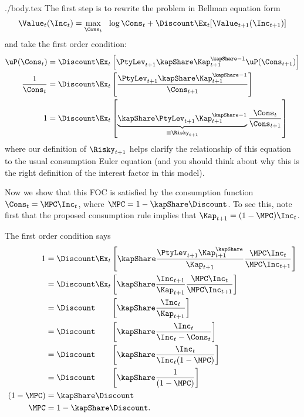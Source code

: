 \documentclass{handout}
\begin{document}
\begin{verbatimwrite}{./body.tex}
The first step is to rewrite the problem in Bellman equation form
\begin{equation}
        \Value_{t}(\Inc_{t}) = \max_{\Cons_{t}} ~~ \log \Cons_{t} + \Discount \Ex_{t} [\Value_{t+1}(\Inc_{t+1})]
\end{equation}
and take the first order condition:
\begin{equation*}\begin{gathered}\begin{aligned}
        \uP(\Cons_{t}) & =  \Discount \Ex_{t}\left[\PtyLev_{t+1} \kapShare \Kap_{t+1}^{\kapShare-1} \uP(\Cons_{t+1})\right]  \\
        \frac{1}{\Cons_{t}} & =  \Discount \Ex_{t}\left[\frac{\PtyLev_{t+1} \kapShare \Kap_{t+1}^{\kapShare-1}}{\Cons_{t+1}}\right]  \\
        1 & =  \Discount \Ex_{t} \left[\underbrace{\kapShare \PtyLev_{t+1} \Kap_{t+1}^{\kapShare-1}}_{\equiv \Risky_{t+1}}\frac{\Cons_{t}}{\Cons_{t+1}}\right] 
\end{aligned}\end{gathered}\end{equation*}
where our definition of $\Risky_{t+1}$ helps clarify the relationship of this equation
to the usual consumption Euler equation (and you should think about why this is the
right definition of the interest factor in this model).  

Now we show that this FOC is satisfied by the consumption function $\Cons_{t} =
\MPC \Inc_{t}$, where $\MPC = 1-\kapShare \Discount$.  To see this, note
first that the proposed consumption rule implies that $\Kap_{t+1} =
(1-\MPC) \Inc_{t}$.

The first order condition says
\begin{equation*}\begin{gathered}\begin{aligned}
1  & =  \Discount \Ex_{t} \left[\kapShare \frac{\PtyLev_{t+1} \Kap_{t+1}^{\kapShare}}{\Kap_{t+1}}\frac{\MPC \Inc_{t}}{\MPC \Inc_{t+1}}\right]  
\\  & =  \Discount \Ex_{t} \left[\kapShare \frac{\Inc_{t+1}}{\Kap_{t+1}}\frac{\MPC \Inc_{t}}{\MPC \Inc_{t+1}}\right]  
\\ & =  \Discount \phantom{\Ex_{t}} \left[\kapShare \frac{\Inc_{t}}{\Kap_{t+1}}\right]
\\ & =  \Discount \phantom{\Ex_{t}} \left[\kapShare \frac{\Inc_{t}}{\Inc_{t}-\Cons_{t}}\right]
\\ & =  \Discount \phantom{\Ex_{t}} \left[\kapShare \frac{\Inc_{t}}{\Inc_{t}(1-\MPC)}\right]
\\ & =  \Discount \phantom{\Ex_{t}} \left[\kapShare \frac{1}{(1-\MPC)}\right]
\\ (1-\MPC) & =  \kapShare \Discount
\\ \MPC     & =  1-\kapShare \Discount.
\end{aligned}\end{gathered}\end{equation*}


\end{verbatimwrite}
\end{document}
